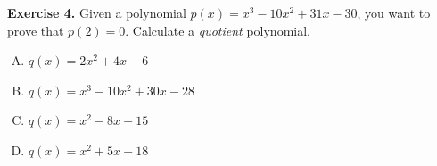 \documentclass{zkdl-tests-template}
\begin{document}
\textbf{Exercise 4.} Given a polynomial $p(x) = x^3 - 10x^2 + 31x - 30$, you want to prove that $p(2) = 0$. 
    Calculate a \textit{quotient} polynomial.

\begin{enumerate}[(A)]
    \item $q(x) = 2x^2 + 4x - 6$
    \item $q(x) = x^3 - 10x^2 + 30x - 28$
    \item $q(x) = x^2 - 8x + 15$
    \item $q(x) = x^2 + 5x + 18$
\end{enumerate}
\end{document}
